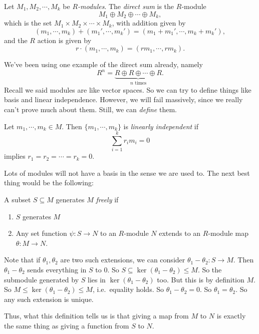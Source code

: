 \documentclass[a4paper]{article}
\begin{document}
\begin{defi}
  Let $M_1, M_2, \cdots, M_k$ be \emph{$R$-modules}. The \emph{direct sum} is the $R$-module
  \[
    M_1 \oplus M_2 \oplus \cdots \oplus M_k,
  \]
  which is the set $M_1 \times M_2 \times \cdots \times M_k$, with addition given by
  \[
    (m_1, \cdots, m_k) + (m_1', \cdots, m_k') = (m_1 + m_1', \cdots, m_k + m_k'),
  \]
  and the $R$ action is given by
  \[
    r\cdot (m_1, \cdots, m_k) = (rm_1, \cdots, rm_k).
  \]
\end{defi}
We've been using one example of the direct sum already, namely
\[
  R^n = \underbrace{R \oplus R \oplus \cdots \oplus R}_{n\text{ times}}.
\]
Recall we said modules are like vector spaces. So we can try to define things like basis and linear independence. However, we will fail massively, since we really can't prove much about them. Still, we can \emph{define} them.

\begin{defi}
  Let $m_1, \cdots, m_k \in M$. Then $\{m_1, \cdots, m_k\}$ is \emph{linearly independent} if
  \[
    \sum_{i = 1}^k r_i m_i = 0
  \]
  implies $r_1 = r_2 = \cdots = r_k = 0$.
\end{defi}

Lots of modules will not have a basis in the sense we are used to. The next best thing would be the following:
\begin{defi}
  A subset $S \subseteq M$ generates $M$ \emph{freely} if
  \begin{enumerate}
    \item $S$ generates $M$
    \item Any set function $\psi: S \to N$ to an $R$-module $N$ extends to an $R$-module map $\theta: M \to N$.
  \end{enumerate}
\end{defi}
Note that if $\theta_1, \theta_2$ are two such extensions, we can consider $\theta_1 - \theta_2: S \to M$. Then $\theta_1 - \theta_2$ sends everything in $S$ to $0$. So $S \subseteq \ker (\theta_1 - \theta_2) \leq M$. So the submodule generated by $S$ lies in $\ker (\theta_1 - \theta_2)$ too. But this is by definition $M$. So $M \leq \ker(\theta_1 - \theta_2) \leq M$, i.e.\ equality holds. So $\theta_1 - \theta_2 = 0$. So $\theta_1 = \theta_2$. So any such extension is unique.

Thus, what this definition tells us is that giving a map from $M$ to $N$ is exactly the same thing as giving a function from $S$ to $N$.
\end{document}
